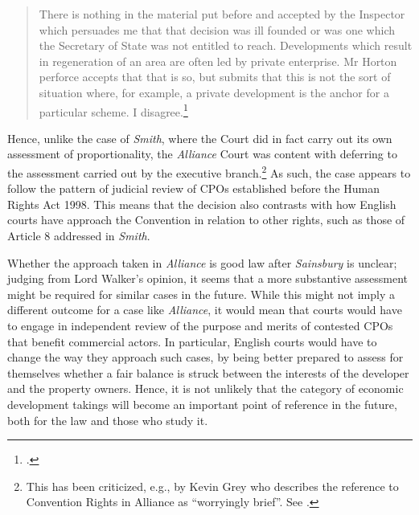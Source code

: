 {\begin{quote}
There is nothing in the material put before and accepted by the Inspector which persuades me that that decision was ill founded or was one which the Secretary of State was not entitled to reach. Developments which result in regeneration of an area are often led by private enterprise. Mr Horton perforce accepts that that is so, but submits that this is not the sort of situation where, for example, a private development is the anchor for a particular scheme. I disagree.\footcite[19]{alliance06}
\end{quote}

Hence, unlike the case of {\it Smith}, where the Court did in fact carry out its own assessment of proportionality, the {\it Alliance} Court was content with deferring to the assessment carried out by the executive branch.\footnote{This has been criticized, e.g., by Kevin Grey who describes the reference to Convention Rights in Alliance as ``worryingly brief''. See \cite{gray11}.} As such, the case appears to follow the pattern of judicial review of CPOs established before the Human Rights Act 1998. This means that the decision also contrasts with how English courts have approach the Convention in relation to other  rights, such as those of Article 8 addressed in {\it Smith}.

Whether the approach taken in {\it Alliance} is good law after {\it Sainsbury} is unclear; judging from Lord Walker's opinion, it seems that a more substantive assessment might be required for similar cases in the future. While this might not imply a different outcome for a case like {\it Alliance}, it would mean that courts would have to engage in independent review of the purpose and merits of contested CPOs that benefit commercial actors. In particular, English courts would have to change the way they approach such cases, by being better prepared to assess for themselves whether a fair balance is struck between the interests of the developer and the property owners. Hence, it is not unlikely that the category of economic development takings will become an important point of reference in the future, both for the law and those who study it. }

